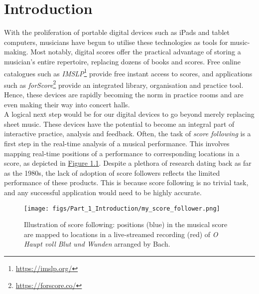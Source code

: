 \chapter{Introduction}{\label{ch:intro}}
With the proliferation of portable digital devices such as iPads and tablet computers, musicians have begun to utilise these technologies as tools for music-making. Most notably, digital scores offer the practical advantage of storing a musician's entire repertoire, replacing dozens of books and scores. Free online catalogues such as \textit{IMSLP}\footnote{\href{https://imslp.org/}{https://imslp.org/}} provide free instant access to scores, and applications such as \textit{forScore}\footnote{\href{https://forscore.co/}{https://forscore.co/}} provide an integrated library, organisation and practice tool. Hence, these devices are rapidly becoming the norm in practice rooms and are even making their way into concert halls.\\

A logical next step would be for our digital devices to go beyond merely replacing sheet music. These devices have the potential to become an integral part of interactive practice, analysis and feedback. Often, the task of \textit{score following} is a first step in the real-time analysis of a musical performance. This involves mapping real-time positions of a performance to corresponding locations in a score, as depicted in \hyperref[fig:score_follower]{Figure \ref*{fig:score_follower}}. Despite a plethora of research dating back as far as the 1980s, the lack of adoption of score followers reflects the limited performance of these products. This is because score following is no trivial task, and any successful application would need to be highly accurate.
\begin{figure}[H]
    \centering
    \texttt{[image: figs/Part\_1\_Introduction/my\_score\_follower.png]}
    \caption{Illustration of score following: positions (blue) in the musical score are mapped to locations in a live-streamed recording (red) of \textit{O Haupt voll Blut und Wunden} arranged by Bach.}
\label{fig:score_follower}
\end{figure}

